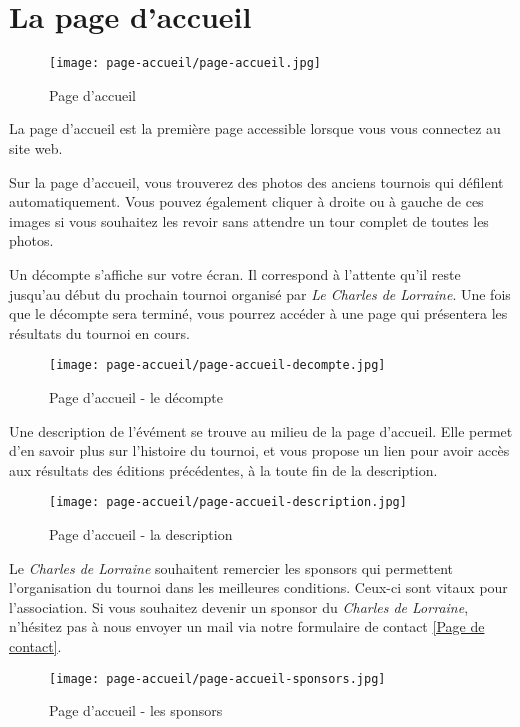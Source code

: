 \section{La page d'accueil}

\begin{figure}[H]
\centering
\texttt{[image: page-accueil/page-accueil.jpg]}
\caption{Page d'accueil}
\end{figure}

La page d'accueil est la première page accessible lorsque vous vous connectez au site web.\newline

Sur la page d'accueil, vous trouverez des photos des anciens tournois qui
défilent automatiquement. Vous pouvez également cliquer à droite ou à gauche
de ces images si vous souhaitez les revoir sans attendre un tour complet de
toutes les photos.\newline

Un décompte s'affiche sur votre écran. Il correspond à l'attente qu'il reste
jusqu'au début du prochain tournoi organisé par \textit{Le Charles de Lorraine}. Une
fois que le décompte sera terminé, vous pourrez accéder à une page qui
présentera les résultats du tournoi en cours.

\begin{figure}[H]
\centering
\texttt{[image: page-accueil/page-accueil-decompte.jpg]}
\caption{Page d'accueil - le décompte}
\end{figure}

Une description de l'évément se trouve au milieu de la page d'accueil. Elle permet d'en savoir plus sur l'histoire du tournoi, et vous
propose un lien pour avoir accès aux résultats des éditions précédentes, à la toute fin de la description.

\begin{figure}[H]
\centering
\texttt{[image: page-accueil/page-accueil-description.jpg]}
\caption{Page d'accueil - la description}
\end{figure}

Le \textit{Charles de Lorraine} souhaitent remercier les sponsors qui permettent
l'organisation du tournoi dans les meilleures conditions. Ceux-ci sont vitaux
pour l'association. Si vous souhaitez devenir un sponsor du \textit{Charles de Lorraine},
n'hésitez pas à nous envoyer un mail via notre formulaire de contact \ref{Page de contact}.

\begin{figure}[H]
\centering
\texttt{[image: page-accueil/page-accueil-sponsors.jpg]}
\caption{Page d'accueil - les sponsors}
\end{figure}

